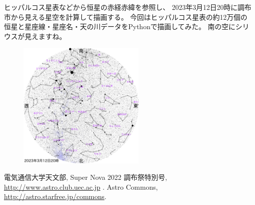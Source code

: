 \documentclass[supernova_2023]{subfiles}
\begin{document}
ヒッパルコス星表などから恒星の赤経赤緯を参照し、
2023年3月12日20時に調布市から見える星空を計算して描画する。
今回はヒッパルコス星表の約12万個の恒星と星座線・星座名・天の川データ\cite{b}をPythonで描画してみた。
南の空にシリウスが見えますね。%
\begin{figure}[h]
  \centering 
  \leavevmode
  \includegraphics[width=0.55\textwidth]{figures/Tadachi/piari.png} 
\end{figure}

\vspace{-3mm}
\begin{thebibliography}{1}
   電気通信大学天文部, Super Nova 2022 調布祭特別号, \url{http://www.astro.club.uec.ac.jp} .
   Astro Commons, \url{http://astro.starfree.jp/commons}.
\end{thebibliography}
\end{document}
